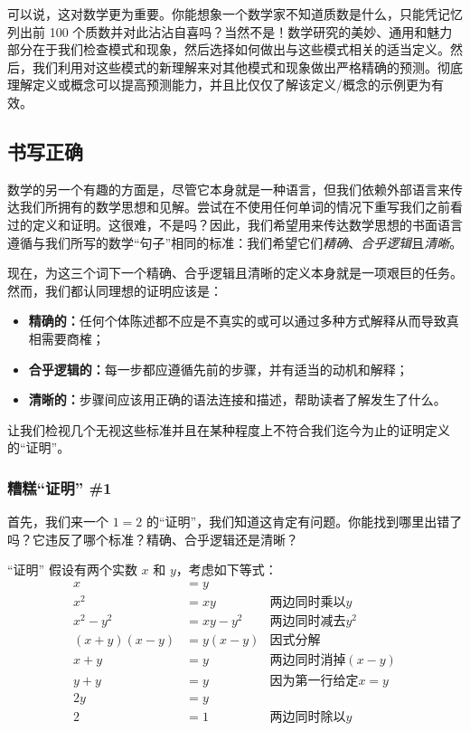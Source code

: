可以说，这对数学更为重要。你能想象一个数学家不知道质数是什么，只能凭记忆列出前 100 个质数并对此沾沾自喜吗？当然不是！数学研究的美妙、通用和魅力部分在于我们检查模式和现象，然后选择如何做出与这些模式相关的适当定义。然后，我们利用对这些模式的新理解来对其他模式和现象做出严格精确的预测。彻底理解定义或概念可以提高预测能力，并且比仅仅了解该定义/概念的示例更为有效。


\subsection{书写正确}

数学的另一个有趣的方面是，尽管它本身就是一种语言，但我们依赖外部语言来传达我们所拥有的数学思想和见解。尝试在不使用任何单词的情况下重写我们之前看过的定义和证明。这很难，不是吗？因此，我们希望用来传达数学思想的书面语言遵循与我们所写的数学“句子”相同的标准：我们希望它们\textit{精确}、\textit{合乎逻辑}且\textit{清晰}。

现在，为这三个词下一个精确、合乎逻辑且清晰的定义本身就是一项艰巨的任务。然而，我们都认同理想的证明应该是：

\begin{itemize}
    \item \textbf{精确的：}任何个体陈述都不应是不真实的或可以通过多种方式解释从而导致真相需要商榷；
    \item \textbf{合乎逻辑的：}每一步都应遵循先前的步骤，并有适当的动机和解释；
    \item \textbf{清晰的：}步骤间应该用正确的语法连接和描述，帮助读者了解发生了什么。
\end{itemize}

让我们检视几个无视这些标准并且在某种程度上不符合我们迄今为止的证明定义的“证明”。

\subsubsection*{糟糕“证明” \#1}

首先，我们来一个 $1=2$ 的“证明”，我们知道这肯定有问题。你能找到哪里出错了吗？它违反了哪个标准？精确、合乎逻辑还是清晰？

\begin{proofs}{“证明”}
    假设有两个实数 $x$ 和 $y$，考虑如下等式：
    \begin{align*}
        x &= y \\
        x^2 &= xy &\text{两边同时乘以} y\\
        x^2-y^2 &= xy-y^2 &\text{两边同时减去} y^2\\
        (x+y)(x-y) &= y(x-y) &\text{因式分解} \\
        x + y &= y &\text{两边同时消掉} (x-y)\\
        y + y &= y &\text{因为第一行给定} x=y\\ 
        2y &= y \\
        2 &= 1 &\text{两边同时除以} y
    \end{align*}
\end{proofs}

